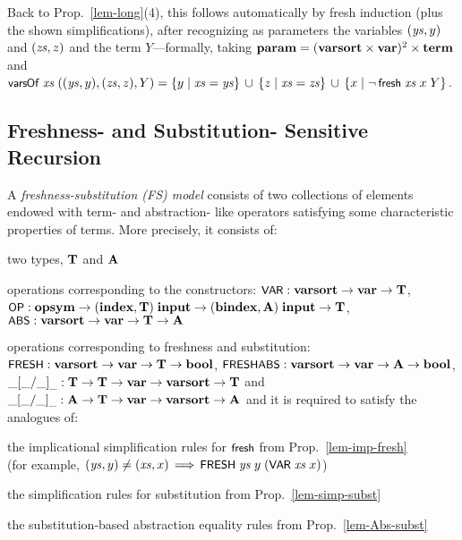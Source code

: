 \documentclass{llncs}
\newenvironment{myitem}[1][]
  {\itemize[leftmargin=*,topsep=0.3ex,itemsep=1pt, #1]}
  {\enditemize}
\begin{document}
Back to Prop.~\ref{lem-long}(4), this follows automatically by fresh induction 
(plus the shown simplifications), after recognizing as parameters the variables $(\ys,y)$ and 
$(\zs,z)$ and the term $Y$---formally, 
taking $\param = (\varsort \times \var)^2 \times \term$ and 
$\varsOf\;\xs\;((\ys,y),(\zs,z),\allowbreak Y) = \{y \mid \xs = \ys\} \,\cup\, 
\{z \mid \xs = \zs\}  \,\cup\, 
\{x \mid \neg\,\fresh\;\xs\;x\;Y\}$. 


 
\subsection{Freshness- and Substitution- Sensitive Recursion}\label{sec-RecDef}

A {\em freshness-substitution (FS) model} consists of two collections of elements endowed 
with term- 
and abstraction- like operators satisfying some 
characteristic properties of terms. 
%
More precisely, it consists of: 
\begin{myitem}
\item two types, $\T$ and $\A$ %
\item operations corresponding to the %
constructors: $\VAR : \varsort \ra \var \ra \T$, 
$\OP : \opsym \allowbreak\ra (\indexx,\T)\;\inputt \ra (\bindexx,\A)\;\inputt \ra \T$, 
$\ABS : \varsort \ra \var \ra \T \ra \A$
\item operations corresponding to freshness and substitution:
$\FRESH : \varsort \ra \var \ra \T \ra \bool$, $\FRESHABS : \varsort \ra \var \ra \A \ra \bool$, 
$\_[\_/\_]_\_ : \T \ra \T \ra \var \ra \varsort \ra \T$ and 
$\_[\_/\_]_\_ : \A \ra \T \ra \var \ra \varsort \ra \A$
\end{myitem}
%
and it is required to satisfy the analogues of:
\begin{myitem}
\item the implicational simplification rules for $\fresh$ from Prop.~\ref{lem-imp-fresh} 
\\(for example, $(\ys,y) \not= (\xs,x) \,\Lra\, \FRESH\;\ys\;y\;(\VAR\;\xs\;x)$)
\item the simplification rules for substitution from Prop.~\ref{lem-simp-subst}
\item the substitution-based abstraction equality rules from Prop.~\ref{lem-Abs-subst}
\end{myitem}
\end{document}
